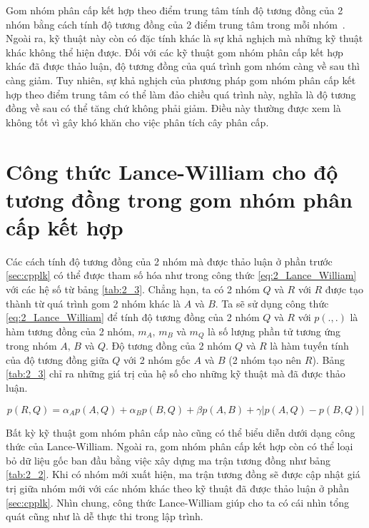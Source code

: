 Gom nhóm phân cấp kết hợp theo điểm trung tâm tính độ tương đồng của 2 nhóm bằng cách tính độ tương đồng của 2 điểm trung tâm trong mỗi nhóm~\cite{Vipin-Kumar, AHC, hierarchical-clustering, centroid}.
Ngoài ra, kỹ thuật này còn có đặc tính khác là sự khả nghịch mà những kỹ thuật khác không thể hiện được.
Đối với các kỹ thuật gom nhóm phân cấp kết hợp khác đã được thảo luận, độ tương đồng của quá trình gom nhóm càng về sau thì càng giảm.
Tuy nhiên, sự khả nghịch của phương pháp gom nhóm phân cấp kết hợp theo điểm trung tâm có thể làm đảo chiều quá trình này, nghĩa là độ tương đồng về sau có thể tăng chứ không phải giảm.
Điều này thường được xem là không tốt vì gây khó khăn cho việc phân tích cây phân cấp.

\section{Công thức Lance-William cho độ tương đồng trong gom nhóm phân cấp kết hợp}
Các cách tính độ tương đồng của 2 nhóm mà được thảo luận ở phần trước \ref{sec:cpplk} có thể được tham số hóa như trong công thức \ref{eq:2_Lance_William} với các hệ số từ bảng \ref{tab:2_3}.
Chẳng hạn, ta có 2 nhóm $Q$ và $R$ với $R$ được tạo thành từ quá trình gom 2 nhóm khác là $A$ và $B$.
Ta sẽ sử dụng công thức \ref{eq:2_Lance_William} để tính độ tương đồng của 2 nhóm $Q$ và $R$ với $p(.,.)$ là hàm tương đồng của 2 nhóm, $m_A, \, m_B$ và $m_Q$ là số lượng phần tử tương ứng trong nhóm $A, \, B$ và $Q$.
Độ tương đồng của 2 nhóm $Q$ và $R$ là hàm tuyến tính của độ tương đồng giữa $Q$ với 2 nhóm gốc $A$ và $B$ (2 nhóm tạo nên $R$).
Bảng \ref{tab:2_3} chỉ ra những giá trị của hệ số cho những kỹ thuật mà đã được thảo luận.

\begin{equation}
\label{eq:2_Lance_William}
p(R,Q)=\alpha_Ap(A,Q) + \alpha_Bp(B,Q) + \beta p(A,B) + \gamma |p(A, Q) - p(B, Q)|
\end{equation}

Bất kỳ kỹ thuật gom nhóm phân cấp nào cũng có thể biểu diễn dưới dạng công thức của Lance-William.
Ngoài ra, gom nhóm phân cấp kết hợp còn có thể loại bỏ dữ liệu gốc ban đầu bằng việc xây dựng ma trận tương đồng như bảng \ref{tab:2_2}.
Khi có nhóm mới xuất hiện, ma trận tương đồng sẽ được cập nhật giá trị giữa nhóm mới với các nhóm khác theo kỹ thuật đã được thảo luận ở phần \ref{sec:cpplk}.
Nhìn chung, công thức Lance-William giúp cho ta có cái nhìn tổng quát cũng như là dễ thực thi trong lập trình.

